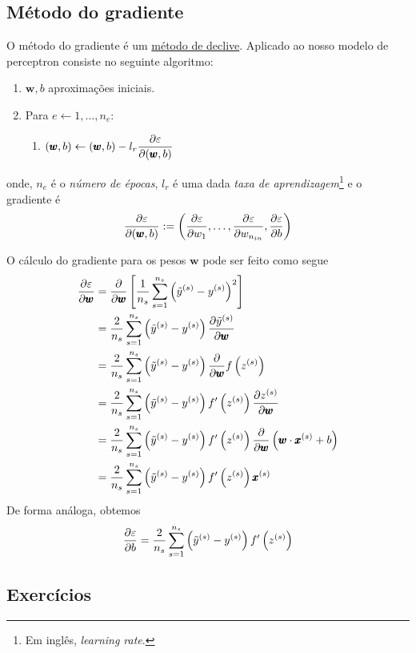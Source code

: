 \subsection{Método do gradiente}

O método do gradiente é um \href{https://notaspedrok.com.br/notas/MatematicaNumericaAvancada/cap_otimizacao_sec_minimi.html}{método de declive}. Aplicado ao nosso modelo de perceptron consiste no seguinte algoritmo:
\begin{enumerate}
\item $\pmb{w}, b$ aproximações iniciais.
\item Para $e\leftarrow 1, \dotsc, n_e$:
  \begin{enumerate}
  \item $\displaystyle (\pmb{w}, b) \leftarrow (\pmb{w}, b) - l_r\frac{\partial\varepsilon}{\partial (\pmb{w}, b)}$
  \end{enumerate}
\end{enumerate}
onde, $n_e$ é o \emph{número de épocas}, $l_r$ é uma dada \emph{taxa de aprendizagem}\footnote{Em inglês, {\it learning rate}.} e o gradiente é
\begin{equation}
  \frac{\partial\varepsilon}{\partial (\pmb{w}, b)} := \left(\frac{\partial\varepsilon}{\partial w_1}, \dotsc, \frac{\partial\varepsilon}{\partial w_{n_{in}}}, \frac{\partial\varepsilon}{\partial b}\right)
\end{equation}

O cálculo do gradiente para os pesos $\pmb{w}$ pode ser feito como segue
\begin{align}
  \frac{\partial\varepsilon}{\partial \pmb{w}} &= \frac{\partial}{\partial\pmb{w}}\left[\frac{1}{n_s}\sum_{s=1}^{n_s}\left(\tilde{y}^{(s)}-y^{(s)}\right)^2\right]\\
                                   &= \frac{2}{n_s}\sum_{s=1}^{n_s}\left(\tilde{y}^{(s)}-y^{(s)}\right)\frac{\partial \tilde{y}^{(s)}}{\partial\pmb{w}}\\
                                   &= \frac{2}{n_s}\sum_{s=1}^{n_s}\left(\tilde{y}^{(s)}-y^{(s)}\right)\frac{\partial}{\partial\pmb{w}}f\left(z^{(s)}\right)\\
                                   &= \frac{2}{n_s}\sum_{s=1}^{n_s}\left(\tilde{y}^{(s)}-y^{(s)}\right)f'\left(z^{(s)}\right)\frac{\partial z^{(s)}}{\partial\pmb{w}}\\
                                   &= \frac{2}{n_s}\sum_{s=1}^{n_s}\left(\tilde{y}^{(s)}-y^{(s)}\right)f'\left(z^{(s)}\right)\frac{\partial}{\partial\pmb{w}}\left(\pmb{w}\cdot\pmb{x}^{(s)} + b\right)\\
                                   &= \frac{2}{n_s}\sum_{s=1}^{n_s}\left(\tilde{y}^{(s)}-y^{(s)}\right)f'\left(z^{(s)}\right)\pmb{x}^{(s)}
\end{align}
De forma análoga, obtemos
\begin{equation}
  \frac{\partial\varepsilon}{\partial b} = \frac{2}{n_s}\sum_{s=1}^{n_s}\left(\tilde{y}^{(s)}-y^{(s)}\right)f'\left(z^{(s)}\right)
\end{equation}

\emconstrucao

\subsection{Exercícios}

\emconstrucao

